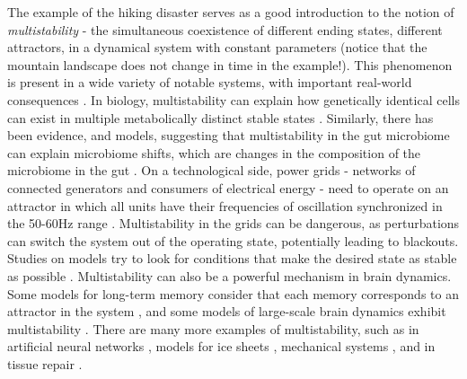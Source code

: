 The example of the hiking disaster serves as a good introduction to the notion of \textit{multistability} - the simultaneous coexistence of different ending states, different attractors, in a dynamical system with constant parameters (notice that the mountain landscape does not change in time in the example!). This phenomenon is present in a wide variety of notable systems, with important real-world consequences \cite{feudel2008complex, pisarchik2022multistability, pisarchik2014control}. In biology, multistability can explain how genetically identical cells can exist in multiple metabolically distinct stable states \cite{zhu2022synthetic, regan2012dynamical}. Similarly, there has been evidence, and models, suggesting that multistability in the gut microbiome can explain microbiome shifts, which are changes in the composition of the microbiome in the gut \cite{khazaei2022metabolic}. On a technological side, power grids - networks of connected generators and consumers of electrical energy - need to operate on an attractor in which all units have their frequencies of oscillation synchronized in the 50-60Hz range \cite{hellmann2020network}. Multistability in the grids can be dangerous, as perturbations can switch the system out of the operating state, potentially leading to blackouts. Studies on models try to look for conditions that make the desired state as stable as possible \cite{hellmann2020network, halekotte2021transient}. Multistability can also be a powerful mechanism in brain dynamics. Some models for long-term memory consider that each memory corresponds to an attractor in the system \cite{wilson1972excitatory, foss1996multistability}, and some models of large-scale brain dynamics exhibit multistability \cite{golos2015multistability}. There are many more examples of multistability, such as in artificial neural networks \cite{flynn2024exploring}, models for ice sheets \cite{robinson2012multistability}, mechanical systems \cite{feudel1998dynamical}, and in tissue repair \cite{adler2020principles}.

